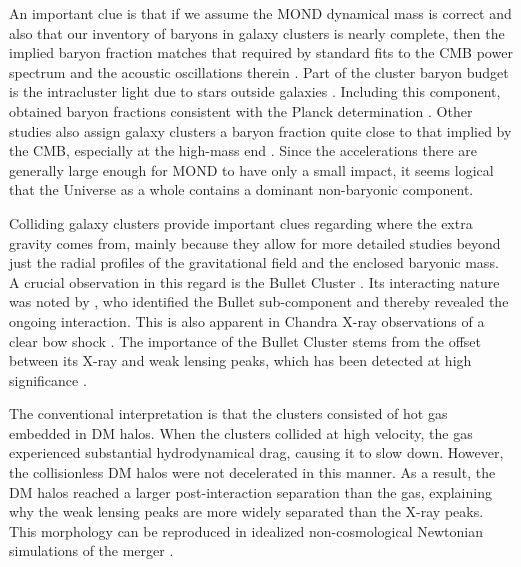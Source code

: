 \documentclass[fleqn,usenatbib,useAMS]{mnras} %
\begin{document}
An important clue is that if we assume the MOND dynamical mass is correct and also that our inventory of baryons in galaxy clusters is nearly complete, then the implied baryon fraction matches that required by standard fits to the CMB power spectrum and the acoustic oscillations therein \citep{Pointecouteau_2005}. Part of the cluster baryon budget is the intracluster light due to stars outside galaxies \citep{Gonzalez_2007}. Including this component, \citet{Gonzalez_2013} obtained baryon fractions consistent with the Planck determination \citep{Planck_2020}. Other studies also assign galaxy clusters a baryon fraction quite close to that implied by the CMB, especially at the high-mass end \citep{Cosmos_2009, McGaugh_2010}. Since the accelerations there are generally large enough for MOND to have only a small impact, it seems logical that the Universe as a whole contains a dominant non-baryonic component.

Colliding galaxy clusters provide important clues regarding where the extra gravity comes from, mainly because they allow for more detailed studies beyond just the radial profiles of the gravitational field and the enclosed baryonic mass. A crucial observation in this regard is the Bullet Cluster \citep[discovered by][]{Tucker_1995}. Its interacting nature was noted by \citet{Tucker_1998}, who identified the Bullet sub-component and thereby revealed the ongoing interaction. This is also apparent in Chandra X-ray observations of a clear bow shock \citep{Markevitch_2002}. The importance of the Bullet Cluster stems from the offset between its X-ray and weak lensing peaks, which has been detected at high significance \citep{Clowe_2004, Clowe_2006}.

The conventional interpretation is that the clusters consisted of hot gas embedded in DM halos. When the clusters collided at high velocity, the gas experienced substantial hydrodynamical drag, causing it to slow down. However, the collisionless DM halos were not decelerated in this manner. As a result, the DM halos reached a larger post-interaction separation than the gas, explaining why the weak lensing peaks are more widely separated than the X-ray peaks. This morphology can be reproduced in idealized non-cosmological Newtonian simulations of the merger \citep{Lage_Farrar_2014}.
\end{document}
